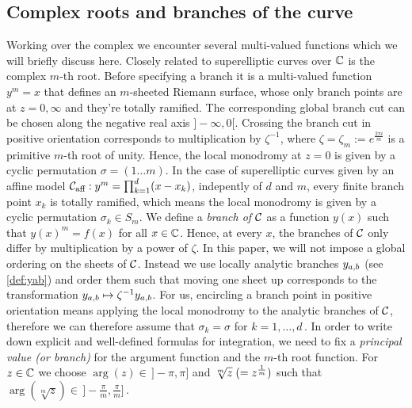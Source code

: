 \documentclass[main.tex]{subfiles}
\begin{document}
   

  
  \subsection{Complex roots and branches of the curve}\label{subsec:roots_branches}


  Working over the complex we encounter several multi-valued functions which we will briefly discuss here.  Closely related to superelliptic curves over $\mathbb{C}$ is the complex $m$-th root. Before specifying
  a branch it is a multi-valued function $y^m = x$ that defines an $m$-sheeted Riemann surface, whose only branch points are at $z = 0,\infty$ and they're totally ramified. The corresponding global
  branch cut can be chosen along the negative real axis $]\!-\infty,0[$. Crossing the branch cut in positive orientation corresponds to multiplication by $\zeta^{-1}$, where $\zeta = \zeta_m
  := e^{\frac{2\pi i }{m}}$ is a primitive $m$-th root of unity. Hence, the local monodromy at $z = 0$ is given by a cyclic permutation $\sigma = (1 \dots m)$. \abstand
 In the case of superelliptic curves given by an affine model $\mathcal{C}_{\text{aff}} : y^m = \prod_{k = 1}^d (x - x_k)$, indepently of $d$ and $m$, every finite branch point $x_k$ is totally ramified, which
 means the local monodromy is given by a cyclic permutation $\sigma_k \in S_m$. We define a 
 \emph{branch of $\mathcal{C}$} as a function
  $y(x)$ such that $y(x)^m = f(x)$ for all $x \in \mathbb{C}$. Hence, at every $x$, the branches of $\mathcal{C}$ only differ by multiplication by a power of $\zeta$. \abstand
  In this paper, we will not impose a global ordering on the sheets of $\mathcal{C}$. Instead we use locally analytic branches $y_{a,b}$ (see \ref{def:yab}) and order them such that moving one sheet up corresponds to the
  transformation $y_{a,b} \mapsto \zeta^{-1}y_{a,b}$. For us, encircling a branch point in positive orientation means applying 
  the local monodromy to the analytic branches of $\mathcal{C}$, therefore we can therefore assume that $\sigma_k = \sigma$ for $k = 1,\dots,d$\,. \abstand
  In order to write down explicit and well-defined formulas for integration, we need to fix a \emph{principal value (or branch)} for the argument function and the $m$-th root function.
  For $z \in \mathbb{C}$ we choose $\arg(z) \in \,]\!\!-\pi,\pi]$ and $\sqrt[m]{z} \;( = z^{\frac{1}{m}} )$ such that $\arg(\sqrt[m]{z}) \in \, ]\!\!-\frac{\pi}{m},\frac{\pi}{m}]$\,.



 
  
\end{document}
